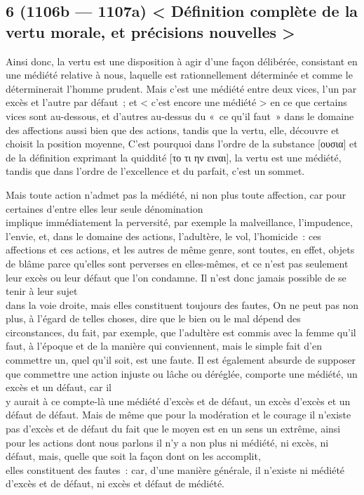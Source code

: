 \documentclass[french,twoside]{book} %
\begin{document}
\subsection[{6 (1106b — 1107a) < Définition complète de la vertu morale, et précisions nouvelles >}]{6 (1106b — 1107a) < Définition complète de la vertu morale, et précisions nouvelles >}
\noindent Ainsi donc, la vertu est une disposition à agir d’une façon délibérée, consistant en une médiété relative à nous, laquelle  est rationnellement déterminée et comme le déterminerait l’homme prudent. Mais c’est une médiété entre deux vices, l’un par excès et l’autre par défaut ; et < c’est encore une médiété > en ce que certains vices sont au-dessous, et d’autres au-dessus du « ce qu’il faut » dans le domaine des affections aussi bien que des actions, tandis que la vertu, elle, découvre et \\
choisit la position moyenne, C’est pourquoi dans l’ordre de la substance [ουσια] et de la définition exprimant la quiddité [το τι ην ειναι], la vertu est une médiété, tandis que dans l’ordre de l’excellence et du parfait, c’est un sommet.\par
Mais toute action n’admet pas la médiété, ni non plus toute affection, car pour certaines d’entre elles leur seule dénomination \\
implique immédiatement la perversité, par exemple la malveillance, l’impudence, l’envie, et, dans le domaine des actions, l’adultère, le vol, l’homicide : ces affections et ces actions, et les autres de même genre, sont toutes, en effet, objets de blâme parce qu’elles sont perverses en elles-mêmes, et ce n’est pas seulement leur excès ou leur défaut que l’on condamne. Il n’est donc jamais possible de se tenir à leur sujet \\
dans la voie droite, mais elles constituent toujours des fautes, On ne peut pas non plus, à l’égard de telles choses, dire que le bien ou le mal dépend des circonstances, du fait, par exemple, que l’adultère est commis avec la femme qu’il faut, à l’époque et de la manière qui conviennent, mais le simple fait d’en commettre un, quel qu’il soit, est une faute. Il est également absurde de supposer que commettre une action injuste ou lâche ou déréglée, comporte une médiété, un excès et un défaut, car il \\
y aurait à ce compte-là une médiété d’excès et de défaut, un excès d’excès et un défaut de défaut. Mais de même que pour la modération et le courage il n’existe pas d’excès et de défaut du fait que le moyen est en un sens un extrême, ainsi pour les actions dont nous parlons il n’y a non plus ni médiété, ni excès, ni défaut, mais, quelle que soit la façon dont on les accomplit, \\
elles constituent des fautes : car, d’une manière générale, il n’existe ni médiété d’excès et de défaut, ni excès et défaut de médiété.
\end{document}
